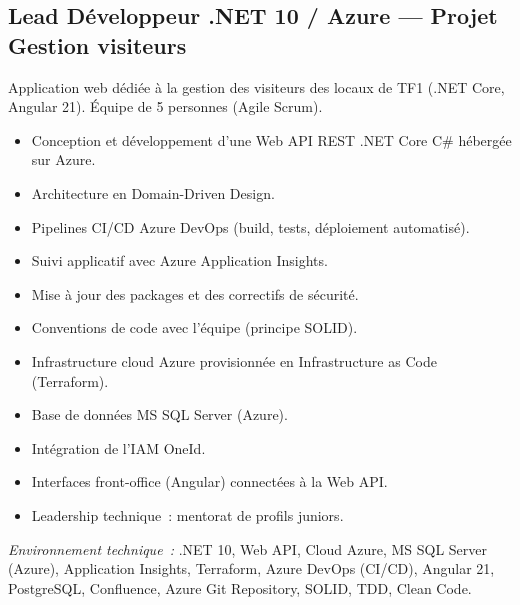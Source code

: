 \documentclass[10pt,a4paper]{article}
\begin{document}
\subsection*{Lead Développeur .NET 10 / Azure --- Projet Gestion visiteurs}
\color{darkgray}
Application web dédiée à la gestion des visiteurs des locaux de TF1 (.NET Core, Angular 21). Équipe de 5 personnes (Agile Scrum).
\begin{itemize}
  \item Conception et développement d'une Web API REST .NET Core C\# hébergée sur Azure.
  \item Architecture en Domain-Driven Design.
  \item Pipelines CI/CD Azure DevOps (build, tests, déploiement automatisé).
  \item Suivi applicatif avec Azure Application Insights.
  \item Mise à jour des packages et des correctifs de sécurité.
  \item Conventions de code avec l'équipe (principe SOLID).
  \item Infrastructure cloud Azure provisionnée en Infrastructure as Code (Terraform).
  \item Base de données MS SQL Server (Azure).
  \item Intégration de l'IAM OneId.
  \item Interfaces front-office (Angular) connectées à la Web API.
  \item Leadership technique~: mentorat de profils juniors.
\end{itemize}
\textit{Environnement technique~:} .NET 10, Web API, Cloud Azure, MS SQL Server (Azure), Application Insights, Terraform, Azure DevOps (CI/CD), Angular 21, PostgreSQL, Confluence, Azure Git Repository, SOLID, TDD, Clean Code.

\vspace{6pt}
\end{document}
